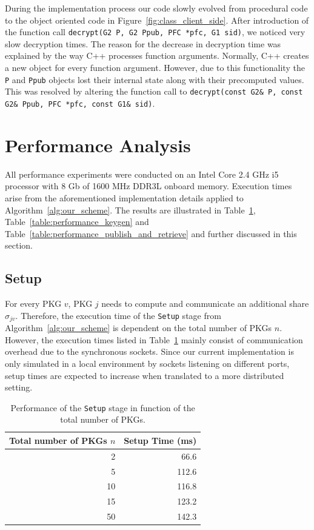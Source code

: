 During the implementation process our code slowly evolved from procedural code to the object oriented code in Figure~\ref{fig:class_client_side}. After introduction of the function call \texttt{decrypt(G2 P, G2 Ppub, PFC *pfc, G1 s\textunderscore id)}, we noticed very slow decryption times. The reason for the decrease in decryption time was explained by the way C++ processes function arguments. Normally, C++ creates a new object for every function argument. However, due to this functionality the \texttt{P} and \texttt{Ppub} objects lost their internal state along with their precomputed values. This was resolved by altering the function call to \texttt{decrypt(const G2\& P, const G2\& Ppub, PFC *pfc, const G1\& s\textunderscore id)}.

\section{Performance Analysis}
\label{sec:performance_analysis}
All performance experiments were conducted on an Intel Core 2.4 GHz i5 processor with 8 Gb of 1600 MHz DDR3L onboard memory. Execution times arise from the aforementioned implementation details applied to Algorithm~\ref{alg:our_scheme}. The results are illustrated in Table~\ref{table:performance_setup}, Table~\ref{table:performance_keygen} and Table~\ref{table:performance_publish_and_retrieve} and further discussed in this section.

\subsection{Setup}
For every PKG $v$, PKG $j$ needs to compute and communicate an additional share $\sigma_{jv}$. Therefore, the execution time of the \texttt{Setup} stage from Algorithm~\ref{alg:our_scheme} is dependent on the total number of PKGs $n$. However, the execution times listed in Table~\ref{table:performance_setup} mainly consist of communication overhead due to the synchronous sockets. Since our current implementation is only simulated in a local environment by sockets listening on different ports, setup times are expected to increase when translated to a more distributed setting.

\begin{table}
  \centering
  \begin{tabular}{@{}rr@{}} \toprule
    Total number of PKGs $n$ & Setup Time (ms) \\ \midrule
    2 & 66.6  \\
    5 & 112.6  \\
    10 & 116.8  \\
    15 & 123.2  \\ 
    50 & 142.3 \\ \bottomrule
  \end{tabular}
  \caption{Performance of the \texttt{Setup} stage in function of the total number of PKGs.}
  \label{table:performance_setup}
\end{table}


